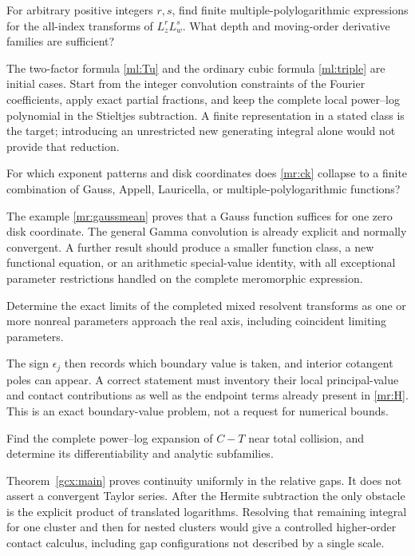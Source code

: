 \begin{question}
For arbitrary positive integers $r,s$, find finite multiple-polylogarithmic
expressions for the all-index transforms of $L_z^rL_w^s$.
What depth and moving-order derivative families are sufficient?
\end{question}
The two-factor formula \eqref{ml:Tu} and the ordinary cubic formula
\eqref{ml:triple} are initial cases. Start from the integer convolution
constraints of the Fourier coefficients, apply exact partial fractions,
and keep the complete local power--log polynomial in the Stieltjes
subtraction. A finite representation in a stated class is the target;
introducing an unrestricted new generating integral alone would not
provide that reduction.

\begin{question}
For which exponent patterns and disk coordinates does
\eqref{mr:ck} collapse to a finite combination of Gauss, Appell,
Lauricella, or multiple-polylogarithmic functions?
\end{question}
The example \eqref{mr:gaussmean} proves that a Gauss function suffices
for one zero disk coordinate. The general Gamma convolution is already
explicit and normally convergent. A further result should produce a
smaller function class, a new functional equation, or an arithmetic
special-value identity, with all exceptional parameter restrictions
handled on the complete meromorphic expression.

\begin{question}
Determine the exact limits of the completed mixed resolvent transforms
as one or more nonreal parameters approach the real axis, including
coincident limiting parameters.
\end{question}
The sign $\epsilon_j$ then records which boundary value is taken, and
interior cotangent poles can appear. A correct statement must inventory
their local principal-value and contact contributions as well as the
endpoint terms already present in \eqref{mr:H}. This is an exact
boundary-value problem, not a request for numerical bounds.

\begin{question}
Find the complete power--log expansion of $C-T$ near total collision,
and determine its differentiability and analytic subfamilies.
\end{question}
Theorem~\ref{gcx:main} proves continuity uniformly in the relative
gaps. It does not assert a convergent Taylor series. After the Hermite
subtraction the only obstacle is the explicit product of translated
logarithms. Resolving that remaining integral for one cluster and then
for nested clusters would give a controlled higher-order contact
calculus, including gap configurations not described by a single scale.

